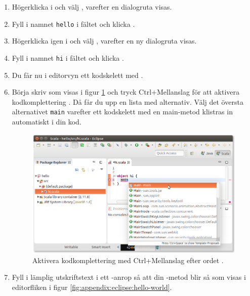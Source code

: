 \begin{enumerate}
\item Högerklicka i  och välj , varefter en dialogruta visas. 

\item Fyll i namnet \texttt{hello} i fältet  och klicka .

\item Högerklicka igen i  och välj , varefter en ny dialogruta visas. 

\item Fyll i namnet \texttt{hi} i fältet  och klicka .

\item Du får nu i editorvyn ett kodskelett med .

\item Börja skriv  som visas i figur \ref{fig:appendix:eclipse:complete-main} och tryck Ctrl+Mellanslag för att aktivera kodkomplettering . Då får du upp en lista med alternativ. Välj det översta alternativet \texttt{main} varefter ett kodskelett med en main-metod klistras in automatiskt i din kod.

\begin{figure}
\centering
\includegraphics[width=1.0\textwidth]{../img/eclipse/eclipse-complete-main.png}
\caption{Aktivera kodkomplettering med Ctrl+Mellanslag efter ordet .}
\label{fig:appendix:eclipse:complete-main}
\end{figure}

\item Fyll i lämplig utskriftstext i ett -anrop så att din -metod blir så som visas i editorfliken i figur \ref{fig:appendix:eclipse:hello-world}.


\end{enumerate}

